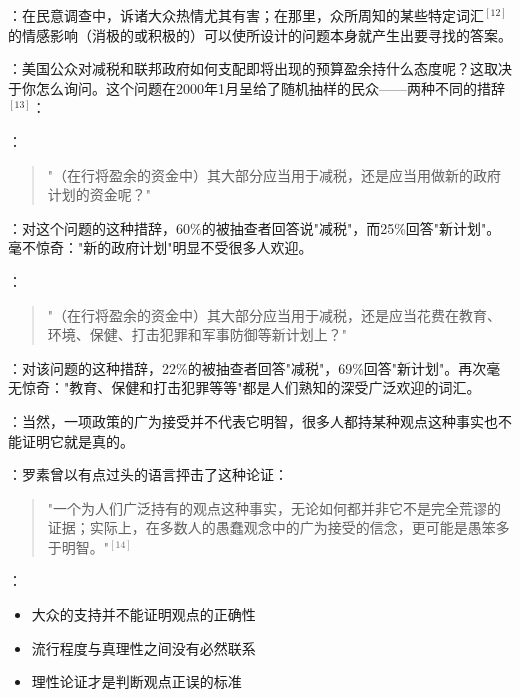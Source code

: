 \begin{examplebox}[title=民意调查中的情感影响]
：在民意调查中，诉诸大众热情尤其有害；在那里，众所周知的某些特定词汇$^{[12]}$的情感影响（消极的或积极的）可以使所设计的问题本身就产生出要寻找的答案。

：美国公众对减税和联邦政府如何支配即将出现的预算盈余持什么态度呢？这取决于你怎么询问。这个问题在2000年1月呈给了随机抽样的民众——两种不同的措辞$^{[13]}$：

：
\begin{quote}
"（在行将盈余的资金中）其大部分应当用于减税，还是应当用做新的政府计划的资金呢？"
\end{quote}

：对这个问题的这种措辞，60\%的被抽查者回答说"减税"，而25\%回答"新计划"。毫不惊奇："新的政府计划"明显不受很多人欢迎。

：
\begin{quote}
"（在行将盈余的资金中）其大部分应当用于减税，还是应当花费在教育、环境、保健、打击犯罪和军事防御等新计划上？"
\end{quote}

：对该问题的这种措辞，22\%的被抽查者回答"减税"，69\%回答"新计划"。再次毫无惊奇："教育、保健和打击犯罪等等"都是人们熟知的深受广泛欢迎的词汇。
\end{examplebox}

\begin{theorembox}[title=大众接受不等于真理]
：当然，一项政策的广为接受并不代表它明智，很多人都持某种观点这种事实也不能证明它就是真的。

：罗素曾以有点过头的语言抨击了这种论证：

\begin{quote}
"一个为人们广泛持有的观点这种事实，无论如何都并非它不是完全荒谬的证据；实际上，在多数人的愚蠢观念中的广为接受的信念，更可能是愚笨多于明智。"$^{[14]}$
\end{quote}

：
\begin{itemize}
  \item 大众的支持并不能证明观点的正确性
  \item 流行程度与真理性之间没有必然联系
  \item 理性论证才是判断观点正误的标准
\end{itemize}
\end{theorembox}